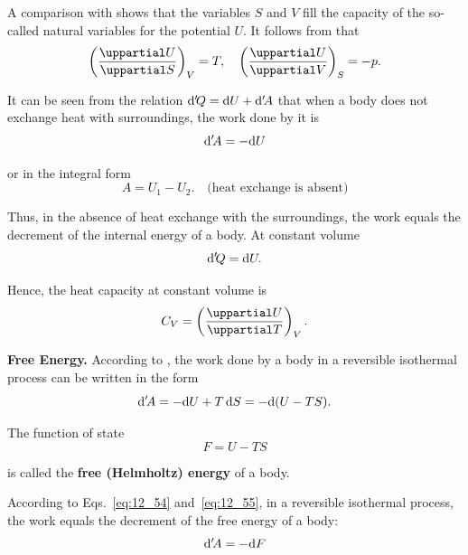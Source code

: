 \noindent
A comparison with  shows that the variables $S$ and $V$ fill the capacity of the so-called natural variables for the potential $U$. It follows from  that
\begin{equation}\label{eq:12_50}
	\parenthesis{\diffpartial{U}{S}}_V = T,\quad 	\parenthesis{\diffpartial{U}{V}}_S = -p.
\end{equation}

It can be seen from the relation $\mathrm{d}'\!Q=\mathrm{d} U+\mathrm{d}'\!A$ that when a body does not exchange heat with surroundings, the work done by it is
\begin{equation*}
	\mathrm{d}'\!A = -\mathrm{d} U
\end{equation*}

\noindent
or in the integral form
\begin{equation}\label{eq:12_51}
	A = U_1 - U_2. \quad \text{(heat exchange is absent)}
\end{equation}

\noindent
Thus, in the absence of heat exchange with the surroundings, the work equals the decrement of the internal energy of a body. At constant volume
\begin{equation}\label{eq:12_52}
	\mathrm{d}'\!Q = \mathrm{d} U.
\end{equation}

\noindent
Hence, the heat capacity at constant volume is
\begin{equation}\label{eq:12_53}
	C_V = \parenthesis{\diffpartial{U}{T}}_V.
\end{equation}

\textbf{Free Energy.} According to , the work done by a body in a reversible isothermal process can be written in the form
\begin{equation}\label{eq:12_54}
	\mathrm{d}'\!A = - \mathrm{d} U + T\,\mathrm{d} S = -\mathrm{d}(U - TS).
\end{equation}

\noindent
The function of state
\begin{equation}\label{eq:12_55}
	F = U - TS
\end{equation}

\noindent
is called the \textbf{free (Helmholtz) energy} of a body.

According to Eqs.~\eqref{eq:12_54} and~\eqref{eq:12_55}, in a reversible isothermal process, the work equals the decrement of the free energy of a body:
\begin{equation}\label{eq:12_56}
	\mathrm{d}'\!A = -\mathrm{d} F
\end{equation}

